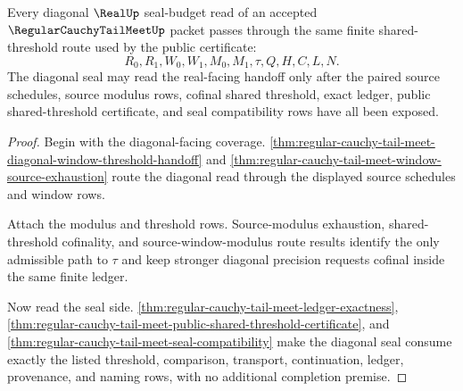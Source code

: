 \begin{theorem}
\label{thm:regular-cauchy-tail-meet-diagonal-seal-budget-exactness}
Every diagonal $\RealUp$ seal-budget read of an accepted $\RegularCauchyTailMeetUp$ packet passes through the same finite shared-threshold route used by the public certificate:
$$
R_0,R_1,W_0,W_1,M_0,M_1,\tau,Q,H,C,L,N.
$$
The diagonal seal may read the real-facing handoff only after the paired source schedules, source modulus rows, cofinal shared threshold, exact ledger, public shared-threshold certificate, and seal compatibility rows have all been exposed.
\end{theorem}
\begin{proof}
Begin with the diagonal-facing coverage. \autoref{thm:regular-cauchy-tail-meet-diagonal-window-threshold-handoff} and \autoref{thm:regular-cauchy-tail-meet-window-source-exhaustion} route the diagonal read through the displayed source schedules and window rows.

Attach the modulus and threshold rows. Source-modulus exhaustion, shared-threshold cofinality, and source-window-modulus route results identify the only admissible path to $\tau$ and keep stronger diagonal precision requests cofinal inside the same finite ledger.

Now read the seal side. \autoref{thm:regular-cauchy-tail-meet-ledger-exactness}, \autoref{thm:regular-cauchy-tail-meet-public-shared-threshold-certificate}, and \autoref{thm:regular-cauchy-tail-meet-seal-compatibility} make the diagonal seal consume exactly the listed threshold, comparison, transport, continuation, ledger, provenance, and naming rows, with no additional completion premise.
\end{proof}

